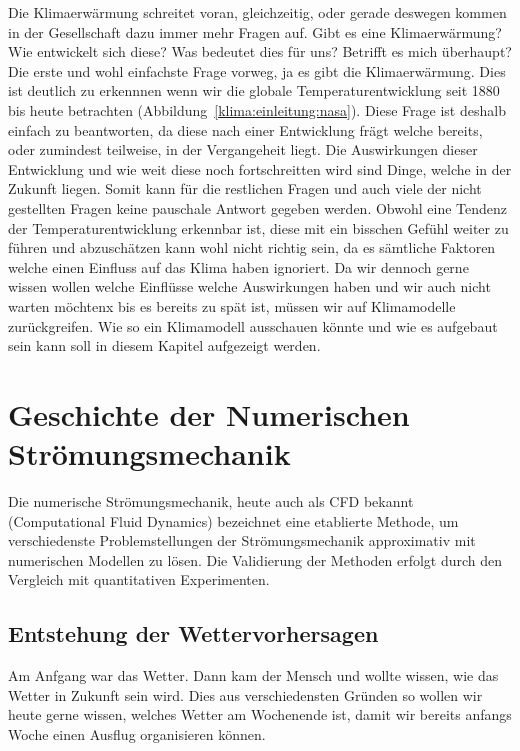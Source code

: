 \begin{refsection}
Die Klimaerwärmung schreitet voran, gleichzeitig, oder gerade deswegen kommen in der Gesellschaft dazu immer mehr Fragen auf. Gibt es eine Klimaerwärmung? Wie entwickelt sich diese? Was bedeutet dies für uns? Betrifft es mich überhaupt? Die erste und wohl einfachste Frage vorweg, ja es gibt die Klimaerwärmung. Dies ist deutlich zu erkennnen wenn wir die globale Temperaturentwicklung seit 1880 bis heute betrachten (Abbildung~\ref{klima:einleitung:nasa}). Diese Frage ist deshalb einfach zu beantworten, da diese nach einer Entwicklung frägt welche bereits, oder zumindest teilweise, in der Vergangeheit liegt. Die Auswirkungen dieser Entwicklung und wie weit diese noch fortschreitten wird sind Dinge, welche in der Zukunft liegen. Somit kann für die restlichen Fragen und auch viele der nicht gestellten Fragen keine pauschale Antwort gegeben werden. Obwohl eine Tendenz der Temperaturentwicklung erkennbar ist, diese mit ein bisschen Gefühl weiter zu führen und abzuschätzen kann wohl nicht richtig sein, da es sämtliche Faktoren welche einen Einfluss auf das Klima haben ignoriert. Da wir dennoch gerne wissen wollen welche Einflüsse welche Auswirkungen haben und wir auch nicht warten möchtenx bis es bereits zu spät ist, müssen wir auf Klimamodelle zurückgreifen. Wie so ein Klimamodell ausschauen könnte und wie es aufgebaut sein kann soll in diesem Kapitel aufgezeigt werden.



\section{Geschichte der Numerischen Strömungsmechanik
\label{klima:section:geschichte}}
Die numerische Strömungsmechanik, heute auch als CFD bekannt (Computational Fluid Dynamics) bezeichnet eine etablierte Methode, um verschiedenste Problemstellungen der Strömungsmechanik approximativ mit numerischen Modellen zu lösen. Die Validierung der Methoden erfolgt durch den Vergleich mit quantitativen Experimenten.



\subsection{Entstehung der Wettervorhersagen
\label{klima:subsection:wetter}}
Am Anfgang war das Wetter. Dann kam der Mensch und wollte wissen, wie das Wetter in Zukunft sein wird. Dies aus verschiedensten Gründen so wollen wir heute gerne wissen, welches Wetter am Wochenende ist, damit wir bereits anfangs Woche einen Ausflug organisieren können.


\end{refsection}
